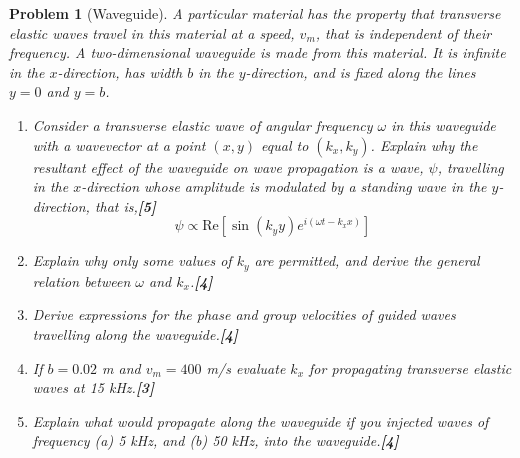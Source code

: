 \documentclass[a4paper]{article}
\theoremstyle{new}
\newtheorem{qns}{Problem}[subsection]
\begin{document}
\begin{qns}[Waveguide]
A particular material has the property that transverse elastic waves travel in this material at a speed, $v_m$, that is independent of their frequency. A two-dimensional waveguide is made from this material. It is infinite in the $x$-direction, has width $b$ in the $y$-direction, and is fixed along the lines $y = 0$ and $y = b$.
\begin{enumerate}[label=(\roman*)]
\item Consider a transverse elastic wave of angular frequency $\omega$ in this waveguide with a wavevector at a point $(x,y)$ equal to $(k_x, k_y)$. Explain why the resultant effect of the waveguide on wave propagation is a wave, $\psi$, travelling in the $x$-direction whose amplitude is modulated by a standing wave in the $y$-direction, that is,\hfill \textbf{[5]}
$$\psi\propto\text{Re}[\sin(k_yy)e^{i(\omega t-k_xx)}]$$
\item Explain why only some values of $k_y$ are permitted, and derive the general relation between $\omega$ and $k_x$.\hfill\textbf{[4]}
\item Derive expressions for the phase and group velocities of guided waves travelling along the waveguide.\hfill\textbf{[4]}
\item If $b = 0.02$ m and $v_m = 400$ m/s evaluate $k_x$ for propagating transverse elastic waves at 15 kHz.\hfill\textbf{[3]}
\item Explain what would propagate along the waveguide if you injected waves of frequency (a) 5 kHz, and (b) 50 kHz, into the waveguide.\hfill\textbf{[4]}
\end{enumerate}
\end{qns}
\end{document}
